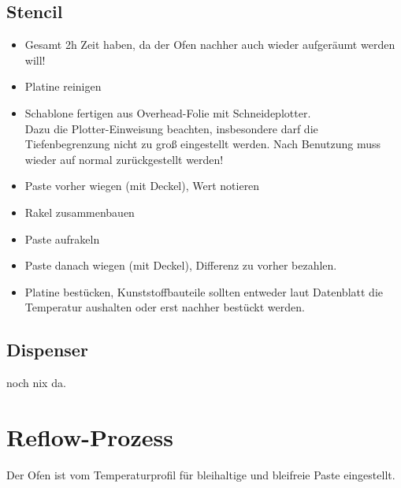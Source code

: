 \documentclass{\basedir/fablab-document}
\begin{document}
\subsection{Stencil}
\begin{itemize}
\item Gesamt 2h Zeit haben, da der Ofen nachher auch wieder aufgeräumt werden will!
\item Platine reinigen
\item Schablone fertigen aus Overhead-Folie mit Schneideplotter. \\ Dazu die Plotter-Einweisung beachten, insbesondere darf die Tiefenbegrenzung nicht zu groß eingestellt werden. Nach Benutzung muss wieder auf normal zurückgestellt werden!
\item Paste vorher wiegen (mit Deckel), Wert notieren
\item Rakel zusammenbauen
\item Paste aufrakeln
\item Paste danach wiegen (mit Deckel), Differenz zu vorher bezahlen.
\item Platine bestücken, Kunststoffbauteile sollten entweder laut Datenblatt die Temperatur aushalten oder erst nachher bestückt werden.
\end{itemize}

\subsection{Dispenser}
noch nix da. 


\section{Reflow-Prozess}
Der Ofen ist vom Temperaturprofil für bleihaltige und bleifreie Paste eingestellt.
\end{document}
